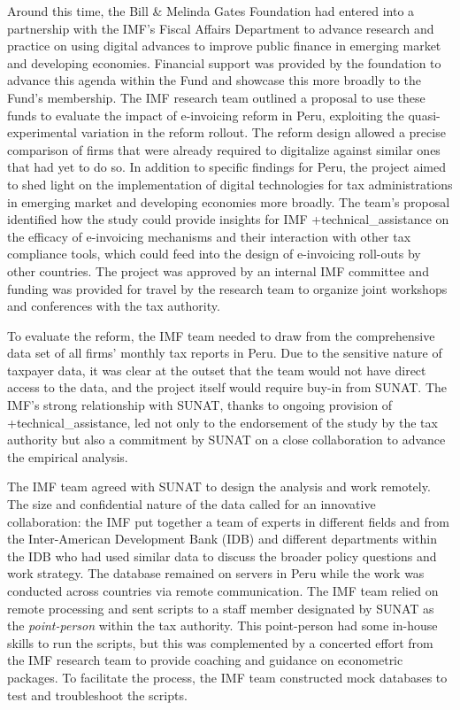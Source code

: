 \documentclass[
]{book}
\begin{document}
Around this time, the Bill \& Melinda Gates Foundation had entered into a partnership with the IMF's Fiscal Affairs Department to advance research and practice on using digital advances to improve public finance in emerging market and developing economies. Financial support was provided by the foundation to advance this agenda within the Fund and showcase this more broadly to the Fund's membership. The IMF research team outlined a proposal to use these funds to evaluate the impact of e-invoicing reform in Peru, exploiting the quasi-experimental variation in the reform rollout. The reform design allowed a precise comparison of firms that were already required to digitalize against similar ones that had yet to do so. In addition to specific findings for Peru, the project aimed to shed light on the implementation of digital technologies for tax administrations in emerging market and developing economies more broadly. The team's proposal identified how the study could provide insights for IMF +technical\_assistance\textbar{} on the efficacy of e-invoicing mechanisms and their interaction with other tax compliance tools, which could feed into the design of e-invoicing roll-outs by other countries. The project was approved by an internal IMF committee and funding was provided for travel by the research team to organize joint workshops and conferences with the tax authority.

To evaluate the reform, the IMF team needed to draw from the comprehensive data set of all firms' monthly tax reports in Peru. Due to the sensitive nature of taxpayer data, it was clear at the outset that the team would not have direct access to the data, and the project itself would require buy-in from SUNAT. The IMF's strong relationship with SUNAT, thanks to ongoing provision of +technical\_assistance\textbar, led not only to the endorsement of the study by the tax authority but also a commitment by SUNAT on a close collaboration to advance the empirical analysis.

The IMF team agreed with SUNAT to design the analysis and work remotely. The size and confidential nature of the data called for an innovative collaboration: the IMF put together a team of experts in different fields and from the Inter-American Development Bank (IDB) and different departments within the IDB who had used similar data to discuss the broader policy questions and work strategy. The database remained on servers in Peru while the work was conducted across countries via remote communication. The IMF team relied on remote processing and sent scripts to a staff member designated by SUNAT as the \emph{point-person} within the tax authority. This point-person had some in-house skills to run the scripts, but this was complemented by a concerted effort from the IMF research team to provide coaching and guidance on econometric packages. To facilitate the process, the IMF team constructed mock databases to test and troubleshoot the scripts.
\end{document}
